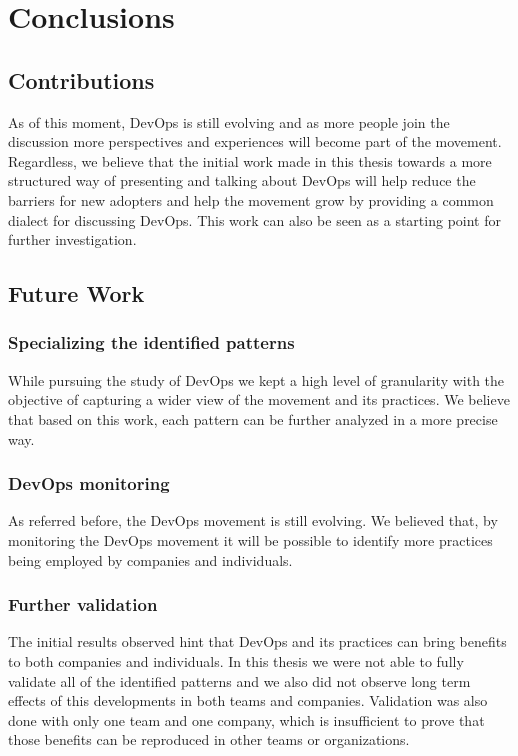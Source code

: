\chapter{ Conclusions } \label{chap:conclusion}
    \section{Contributions}
    As of this moment, DevOps is still evolving and as more people join the discussion more perspectives and experiences will become part of the movement. Regardless, we believe that the initial work made in this thesis towards a more structured way of presenting and talking about DevOps will help reduce the barriers for new adopters and help the movement grow by providing a common dialect for discussing DevOps. This work can also be seen as a starting point for further investigation.



    \section{Future Work}
      \subsection{Specializing the identified patterns}
      While pursuing the study of DevOps we kept a high level of granularity with the objective of capturing a wider view of the movement and its practices. We believe that based on this work, each pattern can be further analyzed in a more precise way.
      \subsection{DevOps monitoring}
      As referred before, the DevOps movement is still evolving. We believed that, by monitoring the DevOps movement it will be possible to identify more practices being employed by companies and individuals.
      \subsection{Further validation}
      The initial results observed hint that DevOps and its practices can bring benefits to both companies and individuals. In this thesis we were not able to fully validate all of the identified patterns and we also did not observe long term effects of this developments in both teams and companies. Validation was also done with only one team and one company, which is insufficient to prove that those benefits can be reproduced in other teams or organizations.
